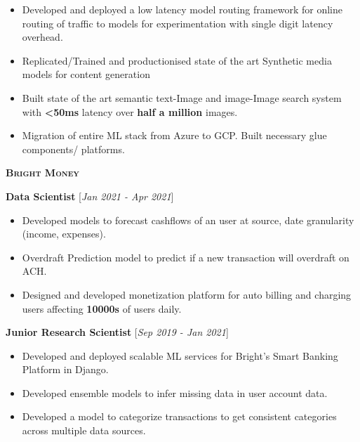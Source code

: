 \documentclass[10pt]{article}
\renewcommand{\textbf}[1]{{\bfseries\color{accent_darkest}#1}}
\newenvironment{leftindented}%
  {\list{}{\leftmargin=0.5in}\item[]}%
  {\endlist}
\begin{document}
\begin{leftindented}
\begin{itemize}
    \item Developed and deployed a low latency  model routing framework for online routing of traffic to models for experimentation with single digit latency overhead.
    \item Replicated/Trained and productionised state of the art Synthetic media models for content generation
    \item Built state of the art semantic text-Image and image-Image search system with \textbf{<50ms} latency over \textbf{half a million} images.
    \item Migration of entire ML stack from Azure to GCP. Built necessary glue components/ platforms.
\end{itemize}
\end{leftindented}

\large\textsc{\textbf{Bright Money}}\normalsize%
\begin{leftindented}
\textbf{Data Scientist} \hfill \textcolor{grey_darker}{[\textit{Jan 2021 - Apr 2021}]}
\begin{itemize}
    \itemsep0em
    \item Developed models to forecast cashflows of an user at source, date granularity (income, expenses).
    \item Overdraft Prediction model to predict if a new transaction will overdraft on ACH.
    \item Designed and developed monetization platform for auto billing and charging users affecting \textbf{10000s} of users daily.
\end{itemize}

\bigskip

\textbf{Junior Research Scientist} \hfill \textcolor{grey_darker}{[\textit{Sep 2019 - Jan 2021}]}
\begin{itemize}
    \itemsep0em
    \item Developed and deployed scalable ML services for Bright's Smart Banking Platform in Django.
    \item Developed ensemble models to infer missing data in user account data.
    \item Developed a model to categorize transactions to get consistent categories across multiple data sources.
\end{itemize}
\end{leftindented}
\end{document}
